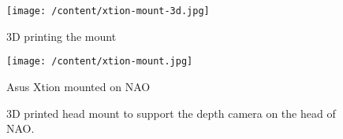 \begin{figure}	 	
	\begin{minipage}
		{.45 
			\textwidth} 
		\centering 
		\texttt{[image: /content/xtion-mount-3d.jpg]} \caption*{3D printing the mount} 
	\end{minipage}
	\begin{minipage}
		{.45 
			\textwidth}  
		\centering
		\texttt{[image: /content/xtion-mount.jpg]} \caption*{Asus Xtion mounted on NAO}
	\end{minipage}	
	\caption{3D printed head mount to support the depth camera on the head of NAO.}
	\label{fg:xtion:mount}
\end{figure}


